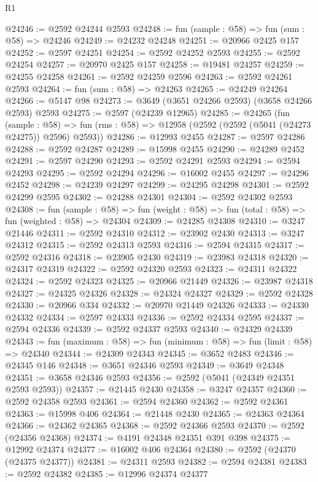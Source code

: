 \begin{lexlean}{R1}
\begin{coremodule}
@24246 := @2592 @24244 @2593
@24248 := fun (sample : @58) => fun (sum : @58) => @24246
@24249 := @24232 @24248
@24251 := @20966 @2425 @157
@24252 := @2597 @24251
@24254 := @2592 @24252 @2593
@24255 := @2592 @24254
@24257 := @20970 @2425 @157
@24258 := @19481 @24257
@24259 := @24255 @24258
@24261 := @2592 @24259 @2596
@24263 := @2592 @24261 @2593
@24264 := fun (sum : @58) => @24263
@24265 := @24249 @24264
@24266 := @5147 @98
@24273 := @3649 (@3651 @24266 @2593) (@3658 @24266 @2593) @2593
@24275 := @2597 (@24239 @12965)
@24285 := @24265
    (fun (sample : @58) =>
    fun (rms : @58) => @12958 (@2592 (@2592 (@5041 (@24273 @24275)) @2596) @2593))
@24286 := @12993 @2455
@24287 := @2597 @24286
@24288 := @2592 @24287
@24289 := @15998 @2455
@24290 := @24289 @2452
@24291 := @2597 @24290
@24293 := @2592 @24291 @2593
@24294 := @2594 @24293
@24295 := @2592 @24294
@24296 := @16002 @2455
@24297 := @24296 @2452
@24298 := @24239 @24297
@24299 := @24295 @24298
@24301 := @2592 @24299 @2595
@24302 := @24288 @24301
@24304 := @2592 @24302 @2593
@24308 := fun (sample : @58) =>
  fun (weight : @58) => fun (total : @58) => fun (weighted : @58) => @24304
@24309 := @24285 @24308
@24310 := @3247 @21446
@24311 := @2592 @24310
@24312 := @23902 @2430
@24313 := @3247 @24312
@24315 := @2592 @24313 @2593
@24316 := @2594 @24315
@24317 := @2592 @24316
@24318 := @23905 @2430
@24319 := @23983 @24318
@24320 := @24317 @24319
@24322 := @2592 @24320 @2593
@24323 := @24311 @24322
@24324 := @2592 @24323
@24325 := @20966 @21449
@24326 := @23987 @24318
@24327 := @24325 @24326
@24328 := @24324 @24327
@24329 := @2592 @24328
@24330 := @20966 @334
@24332 := @20970 @21449 @24326
@24333 := @24330 @24332
@24334 := @2597 @24333
@24336 := @2592 @24334 @2595
@24337 := @2594 @24336
@24339 := @2592 @24337 @2593
@24340 := @24329 @24339
@24343 := fun (maximum : @58) => fun (minimum : @58) => fun (limit : @58) => @24340
@24344 := @24309 @24343
@24345 := @3652 @2483
@24346 := @24345 @146
@24348 := @3651 @24346 @2593
@24349 := @3649 @24348
@24351 := @3658 @24346 @2593
@24356 := @2592 (@5041 (@24349 @24351 @2593 @2593))
@24357 := @21445 @2430
@24358 := @3247 @24357
@24360 := @2592 @24358 @2593
@24361 := @2594 @24360
@24362 := @2592 @24361
@24363 := @15998 @406
@24364 := @21448 @2430
@24365 := @24363 @24364
@24366 := @24362 @24365
@24368 := @2592 @24366 @2593
@24370 := @2592 (@24356 @24368)
@24374 := @4191 @24348 @24351 @391 @398
@24375 := @12992 @24374
@24377 := @16002 @406 @24364
@24380 := @2592 (@24370 (@24375 @24377))
@24381 := @24311 @2593
@24382 := @2594 @24381
@24383 := @2592 @24382
@24385 := @12996 @24374 @24377

\end{coremodule}
\end{lexlean}
